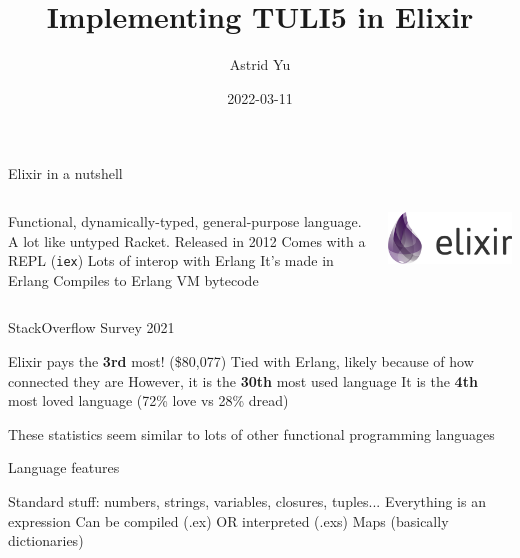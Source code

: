 \documentclass{beamer}
\title{Implementing TULI5 in Elixir}
\author{Astrid Yu}
\institute{CSC 430}
\date{2022-03-11}
\begin{document}
\frame{\titlepage}

\begin{frame}{Elixir in a nutshell}
    \begin{columns}[T]
    \begin{column}{.48\textwidth}
        \begin{outline}
            \1 Functional, dynamically-typed, general-purpose language. A lot like untyped Racket.
            \1 Released in 2012
            \1 Comes with a REPL (\texttt{iex})
            \1 Lots of interop with Erlang
                \2 It's made in Erlang
                \2 Compiles to Erlang VM bytecode
        \end{outline}
    \end{column}
    \begin{column}{.48\textwidth}
        \centering
        \includegraphics[width=0.8\linewidth]{./elixir.png}
    \end{column}
    \end{columns}
\end{frame}

\begin{frame}{StackOverflow Survey 2021}
    \begin{outline}
        \1 Elixir pays the \textbf{3rd} most! (\$80,077) Tied with Erlang, likely because of how connected they are
        \1 However, it is the \textbf{30th} most used language
        \1 It is the \textbf{4th} most loved language (72\% love vs 28\% dread)
    \end{outline}
    These statistics seem similar to lots of other functional programming languages
\end{frame}

\begin{frame}{Language features}
    \begin{outline}
        \1 Standard stuff: numbers, strings, variables, closures, tuples...
        \1 Everything is an expression
        \1 Can be compiled (.ex) OR interpreted (.exs)
        \1 Maps (basically dictionaries)
    \end{outline}
\end{frame}
\end{document}
